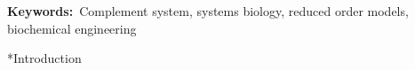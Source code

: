 \documentclass[12pt]{article}
\makeatletter
\renewcommand\section{\@startsection
	{subsection}{2}{0mm}
	{-0.2in}
	{0.05\baselineskip}
	{\normalfont\large\bfseries}}
\makeatother
\begin{document}
\vspace{0.1in}
{\noindent \textbf{Keywords:}~Complement system, systems biology, reduced order models, biochemical engineering}

\pagebreak

\setcounter{page}{1}

\linenumbers


\section*{Introduction}



\end{document}
